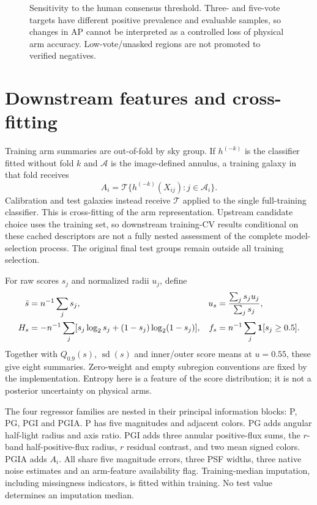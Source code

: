 \documentclass[10pt]{article}
\begin{document}
\begin{figure}[tb]
\centering{}
\caption{Sensitivity to the human consensus threshold. Three- and five-vote
targets have different positive prevalence and evaluable samples, so changes
in AP cannot be interpreted as a controlled loss of physical arm accuracy.
Low-vote/unasked regions are not promoted to verified negatives.}
\end{figure}

\section{Downstream features and cross-fitting}
Training arm summaries are out-of-fold by sky group. If $h^{(-k)}$ is the
classifier fitted without fold $k$ and $\mathcal A$ is the image-defined
annulus, a training galaxy in that fold receives
\begin{equation}
 A_i=\mathcal T\{h^{(-k)}(X_{ij}):j\in\mathcal A_i\}.
\end{equation}
Calibration and test galaxies instead receive $\mathcal T$ applied to the
single full-training classifier. This is cross-fitting of the arm
representation. Upstream candidate choice uses the training set, so downstream
training-CV results conditional on these cached descriptors are not a fully
nested assessment of the complete model-selection process. The original
final test groups remain outside all training selection.

For raw scores $s_j$ and normalized radii $u_j$, define
\begin{align}
 \bar s&=n^{-1}\sum_j s_j,&
 u_s&=\frac{\sum_j s_ju_j}{\sum_j s_j},\\
 H_s&=-n^{-1}\sum_j[s_j\log_2s_j+(1-s_j)\log_2(1-s_j)],&
 f_s&=n^{-1}\sum_j\mathbf{1}[s_j\geq0.5].
\end{align}
Together with $Q_{0.9}(s)$, $\operatorname{sd}(s)$ and inner/outer score means
at $u=0.55$, these give eight summaries. Zero-weight and empty subregion
conventions are fixed by the implementation. Entropy here is a feature of
the score distribution; it is not a posterior uncertainty on physical arms.

The four regressor families are nested in their principal information blocks:
P, PG, PGI and PGIA. P has five magnitudes and adjacent colors. PG adds
angular half-light radius and axis ratio. PGI adds three annular positive-flux
sums, the $r$-band half-positive-flux radius, $r$ residual contrast, and two
mean signed colors. PGIA adds $A_i$. All share five magnitude errors, three
PSF widths, three native noise estimates and an arm-feature availability flag.
Training-median imputation, including missingness indicators, is fitted
within training. No test value determines an imputation median.
\end{document}
